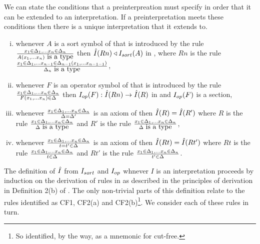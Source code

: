 \note We can state the conditions that a preinterpreation must specify in order that it can be extended to an interpretation.
If a preinterpretation meets these conditions then there is a unique interpretation that it extends to.
\begin{enumerate}[(i)]
\setlength\itemindent{2cm}
\item
whenever $A$ is a sort symbol of \gatUw that is introduced by the rule
$\frac{x_1 \in \Delta_1,... x_{n} \in \Delta_{n}}{A(x_1,...x_n)\mbox{ is a type}}$
then $\hat{I}(Rn) \triangleleft I_{sort}(A)$ in \catc, where $Rn$ is the rule
$\frac{x_1 \in \Delta_1,... x_{n-1} \in \Delta_{n-1}(x_1,...x_{n-1-1})}{\Delta_n\mbox{ is a type}}$,
\item
whenever $F$ is an operator symbol of \gatUw that is introduced by the rule
$\frac{x_1 \in \Delta_1,... x_{n} \in \Delta_{n}}{F(x_1,...x_n) \in \Delta}$
then $I_{op}(F) : \hat{I}(Rn) \rightarrow \hat{I}(R)$  in \catcw and $I_{op}(F)$ is a section,
\item whenever
$\frac{x_1 \in \Delta_1,... x_{n} \in \Delta_{n}}{\Delta = \Delta'}$
is an axiom of \gatUw then $\hat{I}(R) = \hat{I}(R')$
where $R$ is the rule
$\frac{x_1 \in \Delta_1,... x_{n} \in \Delta_{n}}{\Delta\mbox{ is a type}}$
and $R'$ is the rule
$\frac{x_1 \in \Delta_1,... x_{n} \in \Delta_{n}}{\Delta\mbox{ is a type}}$,
\item whenever
$\frac{x_1 \in \Delta_1,... x_{n} \in \Delta_{n}}{t = t' \in \Delta}$
is an axiom of \gatUw then $\hat{I}(Rt) = \hat{I}(Rt')$
where $Rt$ is the rule
$\frac{x_1 \in \Delta_1,... x_{n} \in \Delta_{n}}{t \in \Delta}$
and $Rt'$ is the rule
$\frac{x_1 \in \Delta_1,... x_{n} \in \Delta_{n}}{t' \in \Delta}$.
\end{enumerate}

\note The definition of $\hat{I}$ from $I_{sort}$ and $I_{op}$ whnever $I$ is an interpretation proceeds by induction 
on the derivation of rules in  \gatUw 
as described in the principles of derivation in Definition 2(b) of \cite{Cartmell86}. 
The only non-trivial parts of this definition relate to the rules
identified as CF1, CF2(a) and CF2(b)\footnote{So identified, by the way, as a mnemonic for cut-free.}. We consider each of these rules in turn.

